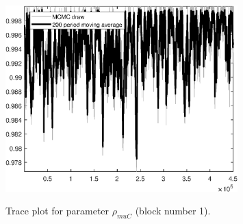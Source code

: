 \begin{figure}[H]
\centering
  \includegraphics[width=0.8\textwidth]{BRS_sectoral_wo_demand_shocks/graphs/TracePlot_rho_muC_blck_1}\\
    \caption{Trace plot for parameter ${\rho_{muC}}$ (block number 1).}
\end{figure}
